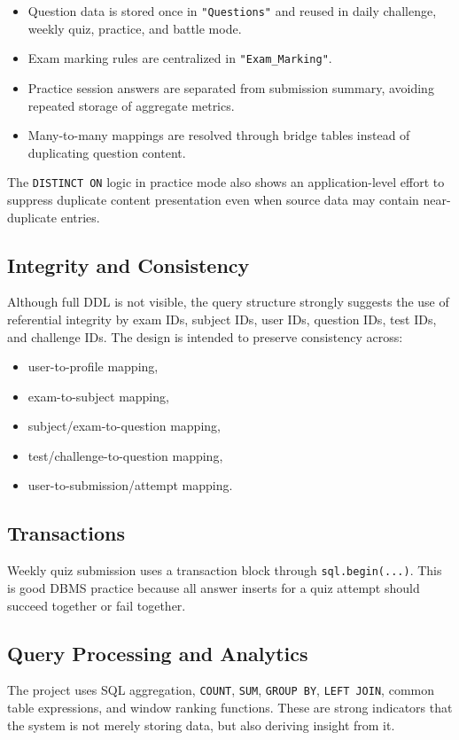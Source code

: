 \documentclass[12pt,a4paper]{article}
\begin{document}
\begin{itemize}[leftmargin=1.5em]
  \item Question data is stored once in \texttt{"Questions"} and reused in daily challenge, weekly quiz, practice, and battle mode.
  \item Exam marking rules are centralized in \texttt{"Exam\_Marking"}.
  \item Practice session answers are separated from submission summary, avoiding repeated storage of aggregate metrics.
  \item Many-to-many mappings are resolved through bridge tables instead of duplicating question content.
\end{itemize}

The \texttt{DISTINCT ON} logic in practice mode also shows an application-level effort to suppress duplicate content presentation even when source data may contain near-duplicate entries.

\subsection{Integrity and Consistency}
Although full DDL is not visible, the query structure strongly suggests the use of referential integrity by exam IDs, subject IDs, user IDs, question IDs, test IDs, and challenge IDs. The design is intended to preserve consistency across:

\begin{itemize}[leftmargin=1.5em]
  \item user-to-profile mapping,
  \item exam-to-subject mapping,
  \item subject/exam-to-question mapping,
  \item test/challenge-to-question mapping,
  \item user-to-submission/attempt mapping.
\end{itemize}

\subsection{Transactions}
Weekly quiz submission uses a transaction block through \texttt{sql.begin(...)}. This is good DBMS practice because all answer inserts for a quiz attempt should succeed together or fail together.

\subsection{Query Processing and Analytics}
The project uses SQL aggregation, \texttt{COUNT}, \texttt{SUM}, \texttt{GROUP BY}, \texttt{LEFT JOIN}, common table expressions, and window ranking functions. These are strong indicators that the system is not merely storing data, but also deriving insight from it.
\end{document}
